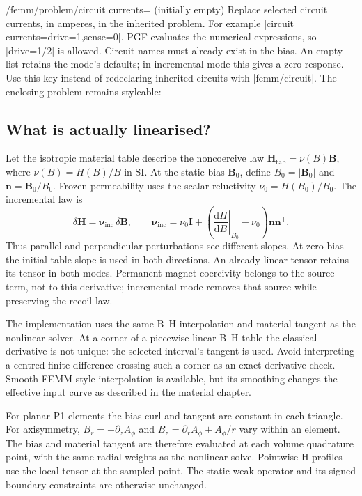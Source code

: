 \begin{key}{/femm/problem/circuit currents= (initially empty)}
Replace selected circuit currents, in amperes, in the inherited problem.
For example |circuit currents={drive=1,sense=0}|. PGF evaluates the numerical
expressions, so |drive=1/2| is allowed. Circuit names must already exist in
the bias. An empty list retains the mode's defaults; in incremental mode
this gives a zero response. Use this key instead of redeclaring inherited
circuits with |femm/circuit|. The enclosing problem remains styleable:
\begin{codeexample}
\end{codeexample}
\end{key}

\subsection{What is actually linearised?}
Let the isotropic material table describe the noncoercive law
$\mathbf H_{\mathrm{tab}}=\nu(B)\mathbf B$, where $\nu(B)=H(B)/B$ in SI.
At the static bias $\mathbf B_0$, define $B_0=|\mathbf B_0|$ and
$\mathbf n=\mathbf B_0/B_0$. Frozen permeability uses the scalar reluctivity
$\nu_0=H(B_0)/B_0$. The incremental law is
\[
 \delta\mathbf H=\boldsymbol\nu_{\mathrm{inc}}\,\delta\mathbf B,
 \qquad
 \boldsymbol\nu_{\mathrm{inc}}=
 \nu_0\mathbf I+
 \left(\left.\frac{\mathrm dH}{\mathrm dB}\right|_{B_0}-\nu_0\right)
 \mathbf n\mathbf n^{\mathsf T}.
\]
Thus parallel and perpendicular perturbations see different slopes. At zero
bias the initial table slope is used in both directions. An already linear
tensor retains its tensor in both modes. Permanent-magnet coercivity belongs
to the source term, not to this derivative; incremental mode removes that
source while preserving the recoil law.

The implementation uses the same B--H interpolation and material tangent as
the nonlinear solver. At a corner of a piecewise-linear B--H table the
classical derivative is not unique: the selected interval's tangent is used.
Avoid interpreting a centred finite difference crossing such a corner as an
exact derivative check. Smooth FEMM-style interpolation is available, but
its smoothing changes the effective input curve as described in the material
chapter.

For planar P1 elements the bias curl and tangent are constant in each
triangle. For axisymmetry, $B_r=-\partial_zA_\phi$ and
$B_z=\partial_rA_\phi+A_\phi/r$ vary within an element. The bias and material
tangent are therefore evaluated at each volume quadrature point, with the
same radial weights as the nonlinear solve. Pointwise H profiles use the
local tensor at the sampled point. The static weak operator and its signed
boundary constraints are otherwise unchanged.

